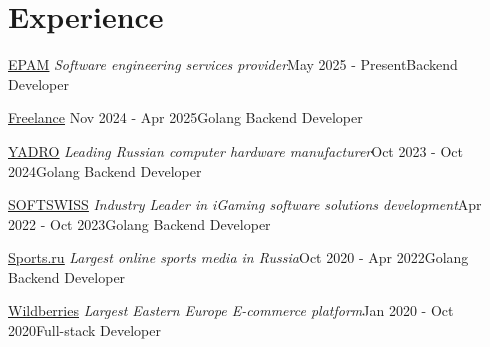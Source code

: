 \section{Experience}

\begin{experienceEntry}
{\href{https://epam.com}{\underline{EPAM}}}
{\textit{Software engineering services provider}}{May 2025 - Present}{Backend Developer}
\end{experienceEntry}

\begin{experienceEntry}
{{\underline{Freelance}}}
{}{Nov 2024 - Apr 2025}{Golang Backend Developer}
    {}
\end{experienceEntry}

\vspace{1em}

\begin{experienceEntry}
{\href{https://yadro.com/}{\underline{YADRO}}}
{\textit{Leading Russian computer hardware manufacturer}}{Oct 2023 - Oct 2024}{Golang Backend Developer}
    {}
\end{experienceEntry}

\vspace{1em}

\begin{experienceEntry}
{\href{https://softswiss.com}{\underline{SOFTSWISS}}}
{\textit{Industry Leader in iGaming software solutions development}}{Apr 2022 - Oct 2023}{Golang Backend Developer}
    {}
\end{experienceEntry}

\vspace{1em}

\begin{experienceEntry}
{\href{https://sports.ru}{\underline{Sports.ru}}}
{\textit{Largest online sports media in Russia}}{Oct 2020 - Apr 2022}{Golang Backend Developer}
    {}
\end{experienceEntry}

\vspace{1em}

\begin{experienceEntry}
{\href{https://wildberries.ru}{\underline{Wildberries}}}
{\textit{Largest Eastern Europe E-commerce platform}}{Jan 2020 - Oct 2020}{Full-stack Developer}
    {}
\end{experienceEntry}

\vspace{1em}
